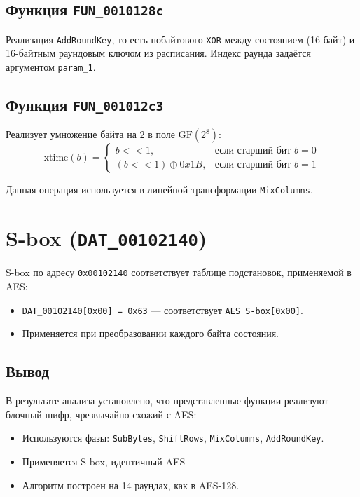     \subsection{Функция \texttt{FUN\_0010128c}}

    Реализация \texttt{AddRoundKey}, то есть побайтового \texttt{XOR} между состоянием (16 байт) и 16-байтным раундовым ключом из расписания.
    Индекс раунда задаётся аргументом \texttt{param\_1}.

    \subsection{Функция \texttt{FUN\_001012c3}}

    Реализует умножение байта на 2 в поле $\mathrm{GF}(2^8)$:
    \[
        \text{xtime}(b) =
        \begin{cases}
            b << 1, & \text{если старший бит } b = 0 \\
            (b << 1) \oplus 0x1B, & \text{если старший бит } b = 1
        \end{cases}
    \]

    Данная операция используется в линейной трансформации \texttt{MixColumns}.


    \section{S-box (\texttt{DAT\_00102140})}

    S-box по адресу \texttt{0x00102140} соответствует таблице подстановок, применяемой в AES:
    \begin{itemize}
        \item \texttt{DAT\_00102140[0x00] = 0x63} — соответствует \texttt{AES S-box[0x00]}.
        \item Применяется при преобразовании каждого байта состояния.
    \end{itemize}

    \subsection*{Вывод}

    В результате анализа установлено, что представленные функции реализуют блочный шифр, чрезвычайно схожий с AES:
    \begin{itemize}
        \item Используются фазы: \texttt{SubBytes}, \texttt{ShiftRows}, \texttt{MixColumns}, \texttt{AddRoundKey}.
        \item Применяется S-box, идентичный AES
        \item Алгоритм построен на 14 раундах, как в AES-128.
    \end{itemize}

